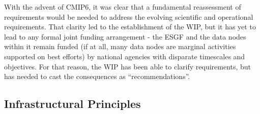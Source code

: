 \documentclass[gmd,manuscript]{copernicus}
\newcommand{\pllabel}[1]{\label{p-#1}\linelabel{l-#1}}
\begin{document}
With the advent of CMIP6, it was clear that
\pllabel{RC2-14}
a fundamental reassessment of requirements would be needed to address
the evolving scientific and operational requirements. That clarity led
to the establishment of the WIP, but it has yet to lead to any formal
joint funding arrangement - the ESGF and the data nodes within it
remain funded (if at all, many data nodes are marginal activities
supported on best efforts) by national agencies with disparate
timescales and objectives. For that reason, the WIP has been able to
clarify requirements, but has needed to cast the consequences as
``recommendations''.

\subsection{Infrastructural Principles}
\label{sec:infra-principles}
\end{document}

